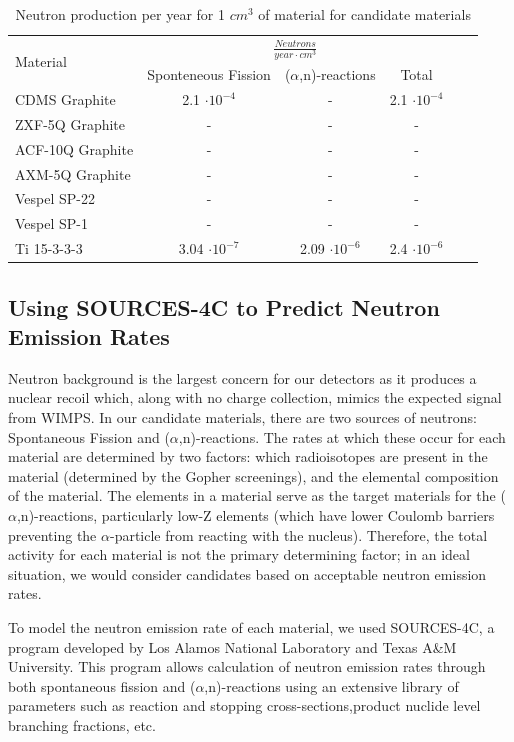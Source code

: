 \documentclass{report}
\begin{document}
\begin{table}[htb]
\centering
\begin{threeparttable}
\begin{tabular}{l|ccccc}
\multirow{2}{*}{\large{Material}} & \multicolumn{3}{c}{$\frac{Neutrons}{year \cdot cm^{3}}$}\\
& Sponteneous Fission & ($\alpha$,n)-reactions & Total \\\toprule
CDMS Graphite & 2.1 $\cdot 10^{-4}$ & - & 2.1 $\cdot 10^{-4}$ \\
ZXF-5Q Graphite & - & - & - \\
ACF-10Q Graphite & - & - & - \\
AXM-5Q Graphite & - & - & - \\
Vespel SP-22 & - & - & - \\
Vespel SP-1 & - & - & - \\
Ti 15-3-3-3 & 3.04 $\cdot 10^{-7}$ & 2.09 $\cdot 10^{-6}$ & 2.4 $\cdot 10^{-6}$ \\

\end{tabular}
\caption{Neutron production per year for 1 $cm^{3}$ of material for candidate materials}
\end{threeparttable}
\end{table}

\subsection{Using SOURCES-4C to Predict Neutron Emission Rates}
Neutron background is the largest concern for our detectors as it produces a
nuclear recoil which, along with no charge collection, mimics the expected signal
from WIMPS. In our candidate materials, there are two sources of neutrons:
Spontaneous Fission and ($\alpha$,n)-reactions. The rates at which these occur for each material are determined by two factors: which radioisotopes are present in the material (determined by the Gopher screenings), and the elemental composition of the material. The elements in a material serve as the target materials for the ($\alpha$,n)-reactions, particularly low-Z elements (which have lower Coulomb barriers preventing the $\alpha$-particle from reacting with the nucleus). Therefore, the total activity for each material is not the primary determining factor; in an ideal situation, we would consider candidates based on acceptable neutron emission rates.

To model the neutron emission rate of each material, we used SOURCES-4C, a program
developed by Los Alamos National Laboratory and Texas A\&M University. This
program allows calculation of neutron emission rates through both spontaneous
fission and ($\alpha$,n)-reactions using an extensive library of parameters
such as reaction and stopping cross-sections,product nuclide level branching
fractions, etc.
\end{document}
